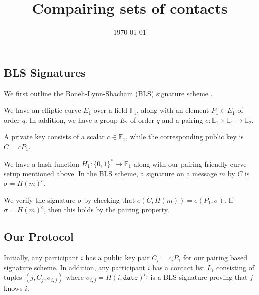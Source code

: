 \documentclass[twoside,letterpaper]{sig-alternate}
\title{Compairing sets of contacts}
\date{\today}
\begin{document}
\maketitle




\def\E{\mathbb{E}}
\def\F{\mathbb{F}}
\def\Z{\mathbb{Z}}




\subsection{BLS Signatures}

We first outline the Boneh-Lynn-Shacham (BLS) signature scheme \cite{BLS-SigWeilPairing}.

We have an elliptic curve $E_1$ over a field $\F_1$,
 along with an element $P_1 \in E_1$ of order $q$.
In addition, we have a group $E_2$ of order $q$ and
 a pairing $e : \E_1 \times \E_1 \to \E_2$.

A private key consists of a scalar $c \in \F_1$, while
the corresponding public key is $C = c P_1$.

We have a hash function $H_1 : \{0,1\}^* \to \E_1$ along with
 our pairing friendly curve setup mentioned above.
In the BLS scheme,
a signature on a message $m$ by $C$ is $\sigma = H(m)^c$.

We verify the signature $\sigma$ by checking that
  $e(C,H(m)) = e(P_1,\sigma)$.
If $\sigma = H(m)^c$, then this holds by the pairing property.

\subsection{Our Protocol}

Initially, any participant $i$ has a public key pair $C_i = c_i P_1$
 for our pairing based signature scheme.  
In addition, any participant $i$ has a contact list $L_i$ consisting
of tuples $(j,C_j,\sigma_{i,j})$ where
 $\sigma_{i,j} = H(i,\texttt{date})^{c_j}$
 is a BLS signature proving that $j$ knows $i$.
\end{document}
